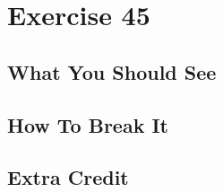 \chapter{Exercise 45}


\section{What You Should See}


\section{How To Break It}


\section{Extra Credit}



